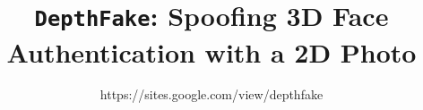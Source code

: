 \documentclass[conference,compsoc]{IEEEtran}
\begin{document}
	\pagestyle{plain}

\title{ \Large \bf \texttt{DepthFake}: Spoofing 3D Face Authentication with a 2D Photo
\\
}

\author{https://sites.google.com/view/depthfake}

\maketitle







% 











\end{document}
